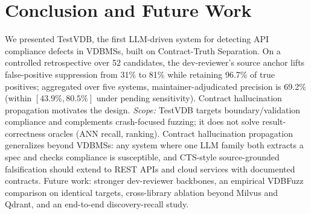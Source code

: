 \documentclass[sigconf]{acmart}
\begin{document}
\section{Conclusion and Future Work}\label{sec:conc}
We presented TestVDB, the first LLM-driven system for detecting API compliance defects in VDBMSs, built on Contract-Truth Separation. On a controlled retrospective over 52 candidates, the dev-reviewer's source anchor lifts false-positive suppression from 31\% to 81\% while retaining 96.7\% of true positives; aggregated over five systems, maintainer-adjudicated precision is 69.2\% (within $[43.9\%, 80.5\%]$ under pending sensitivity). Contract hallucination propagation motivates the design. \emph{Scope:} TestVDB targets boundary/validation compliance and complements crash-focused fuzzing; it does not solve result-correctness oracles (ANN recall, ranking). Contract hallucination propagation generalizes beyond VDBMSs: any system where one LLM family both extracts a spec and checks compliance is susceptible, and CTS-style source-grounded falsification should extend to REST APIs and cloud services with documented contracts. Future work: stronger dev-reviewer backbones, an empirical VDBFuzz comparison on identical targets, cross-library ablation beyond Milvus and Qdrant, and an end-to-end discovery-recall study.



\end{document}
